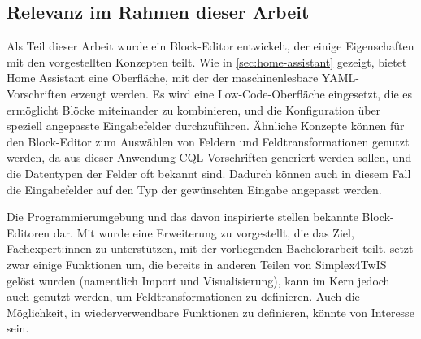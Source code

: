 \subsection{Relevanz im Rahmen dieser Arbeit}

Als Teil dieser Arbeit wurde ein Block-Editor entwickelt, der einige Eigenschaften mit den vorgestellten Konzepten teilt. Wie in \ref{sec:home-assistant} gezeigt, bietet Home Assistant eine Oberfläche, mit der der maschinenlesbare \ac{YAML}-Vorschriften erzeugt werden. Es wird eine Low-Code-Oberfläche eingesetzt, die es ermöglicht Blöcke miteinander zu kombinieren, und die Konfiguration über speziell angepasste Eingabefelder durchzuführen. Ähnliche Konzepte können für den Block-Editor zum Auswählen von Feldern und Feldtransformationen genutzt werden, da aus dieser Anwendung \ac{CQL}-Vorschriften generiert werden sollen, und die Datentypen der Felder oft bekannt sind. Dadurch können auch in diesem Fall die Eingabefelder auf den Typ der gewünschten Eingabe angepasst werden.

Die Programmierumgebung \Scratch{} und das davon inspirierte \Snap{} stellen bekannte Block-Editoren dar. Mit \DataSnap{} wurde eine Erweiterung zu \Snap{} vorgestellt, die das Ziel, Fachexpert:innen zu unterstützen, mit der vorliegenden Bachelorarbeit teilt. \DataSnap{} setzt zwar einige Funktionen um, die bereits in anderen Teilen von Simplex4TwIS gelöst wurden (namentlich Import und Visualisierung), kann im Kern jedoch auch genutzt werden, um Feldtransformationen zu definieren. Auch die Möglichkeit, in \Snap{} wiederverwendbare Funktionen zu definieren, könnte von Interesse sein.

